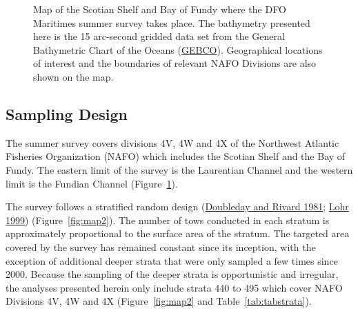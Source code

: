\documentclass[12pt]{article}\usepackage[]{graphicx}\usepackage[]{color}
\begin{document}
\begin{figure}[htb]

{\centering {} 

}

\caption{Map of the Scotian Shelf and Bay of Fundy where the DFO Maritimes summer survey takes place. The bathymetry presented here is the 15 arc-second gridded data set from the General Bathymetric Chart of the Oceans (\href{https://www.gebco.net/data_and_products/gridded_bathymetry_data/}{GEBCO}). Geographical locations of interest and the boundaries of relevant NAFO Divisions are also shown on the map.}\label{fig:map1}
\end{figure}
\hypertarget{sampling-design}{%
\subsection{Sampling Design}\label{sampling-design}}

The summer survey covers divisions 4V, 4W and 4X of the Northwest Atlantic Fisheries Organization (NAFO) which includes the Scotian Shelf and the Bay of Fundy. The eastern limit of the survey is the Laurentian Channel and the western limit is the Fundian Channel (Figure~\ref{fig:map1}).

The survey follows a stratified random design (\protect\hyperlink{ref-DoubledayRivard1981}{Doubleday and Rivard 1981}; \protect\hyperlink{ref-Lohr1999}{Lohr 1999}) (Figure~\ref{fig:map2}). The number of tows conducted in each stratum is approximately proportional to the surface area of the stratum. The targeted area covered by the survey has remained constant since its inception, with the exception of additional deeper strata that were only sampled a few times since 2000. Because the sampling of the deeper strata is opportunistic and irregular, the analyses presented herein only include strata 440 to 495 which cover NAFO Divisions 4V, 4W and 4X (Figure~\ref{fig:map2} and Table~\ref{tab:tabstrata}).
\end{document}
